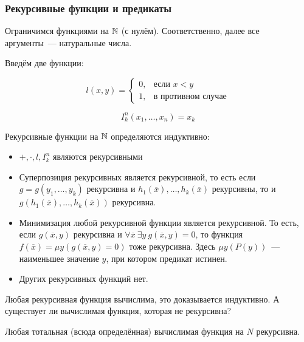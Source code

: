 
\subsubsection{Рекурсивные функции и предикаты}

Ограничимся функциями на ${\mathbb N}$ (с нулём). Соответственно, далее все аргументы~— натуральные числа.

Введём две функции:

\[
    l(x, y) = \begin{cases}0, & \text{если $x<y$}\\ 1, &\text{в противном случае}\end{cases}
\]

\[
    I^n_k(x_1, \ldots, x_n) = x_k 
\]

\begin{definition}
    Рекурсивные функции на ${\mathbb N}$ определяются индуктивно:
    \begin{itemize}
        \item $+, \cdot, l, I_k^n$ являются рекурсивными
        \item Суперпозиция рекурсивных является рекурсивной, то есть если $g = g(y_1, \ldots, y_k)$ рекурсивна и $h_1(\overline{x}), \ldots, h_k(\overline{x})$ рекурсивны, то и $g(h_1(\overline{x}), \ldots, h_k(\overline{x}))$ рекурсивна.
        \item Минимизация любой рекурсивной функции является рекурсивной. То есть, если $g(\overline{x}, y)$ рекурсивна и $\forall \overline{x}~\exists y~g(\overline{x}, y)=0$, то функция $f(\overline{x})=\mu y(g(\overline{x}, y)=0)$ тоже рекурсивна. Здесь $\mu y(P(y))$~— наименьшее значение $y$, при котором предикат истинен.
        \item Других рекурсивных функций нет.
    \end{itemize}
\end{definition}

\begin{remark}
    Любая рекурсивная функция вычислима, это доказывается индуктивно. А существует ли вычислимая функция, которая не рекурсивна?
\end{remark}

\begin{conjecture}
    Любая тотальная (всюда определённая) вычислимая функция на $N$ рекурсивна.
\end{conjecture}


